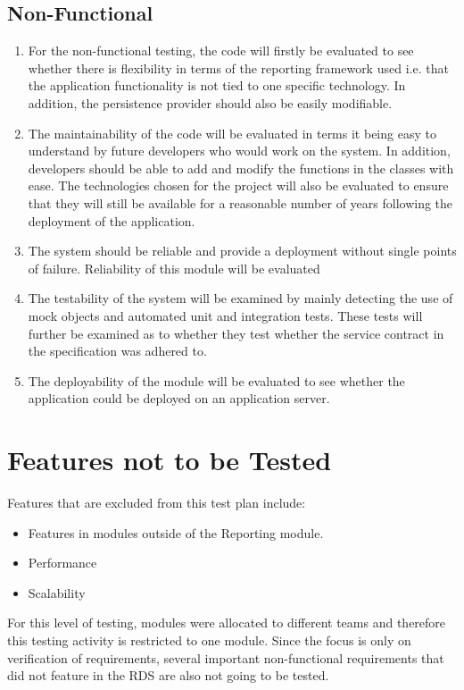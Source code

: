 \subsection{Non-Functional}
\begin{enumerate}
\item For the non-functional testing, the code will firstly be evaluated to see whether there is flexibility in terms of the reporting framework used i.e. that the application functionality is not tied to one specific technology. In addition, the persistence provider should also be easily modifiable. 
\item The maintainability of the code will be evaluated in terms it being easy to understand by future developers who would work on the system. In addition, developers should be able to add and modify the functions in the classes with ease. The technologies chosen for the project will also be evaluated to ensure that they will still be available for a reasonable number of years following the deployment of the application.
\item The system should be reliable and provide a deployment without single points of failure. Reliability of this module will be evaluated 
\item The testability of the system will be examined by mainly detecting the use of mock objects and automated unit and integration tests. These tests will further be examined as to whether they test whether the service contract in the specification was adhered to.
\item The deployability of the module will be evaluated to see whether the application could be deployed on an application server.
\end{enumerate}

\section{Features not to be Tested}
\label{featuresNotToTest}
Features that are excluded from this test plan include:
\begin{itemize}
	\item Features in modules outside of the Reporting module.
	\item Performance
	\item Scalability
\end{itemize}

For this level of testing, modules were allocated to different teams and therefore this testing activity is restricted to one module. Since the focus is only on verification of requirements, several important non-functional requirements that did not feature in the RDS are also not going to be tested.

